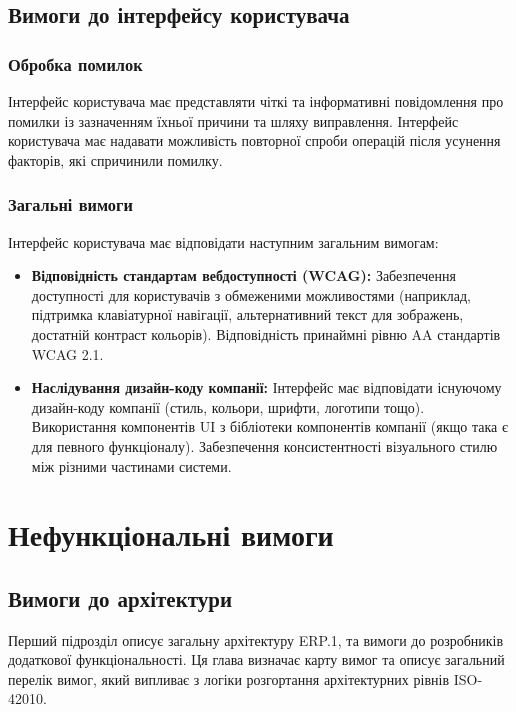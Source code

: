 \documentclass{article}
\begin{document}
\subsection{Вимоги до інтерфейсу користувача}

\subsubsection{Обробка помилок}
Інтерфейс користувача має представляти чіткі та інформативні повідомлення про помилки із
зазначенням їхньої причини та шляху виправлення. Інтерфейс користувача має надавати можливість
повторної спроби операцій після усунення факторів, які спричинили помилку.

\subsubsection{Загальні вимоги}
Інтерфейс користувача має відповідати наступним загальним вимогам:

\begin{itemize}
    \item \textbf{Відповідність стандартам вебдоступності (WCAG):} Забезпечення доступності для
           користувачів з обмеженими можливостями (наприклад, підтримка клавіатурної навігації,
           альтернативний текст для зображень, достатній контраст кольорів). Відповідність принаймні рівню AA стандартів WCAG 2.1.
    \item \textbf{Наслідування дизайн-коду компанії:} Інтерфейс має відповідати існуючому дизайн-коду
           компанії (стиль, кольори, шрифти, логотипи тощо). Використання компонентів UI з бібліотеки
           компонентів компанії (якщо така є для певного функціоналу). Забезпечення консистентності
           візуального стилю між різними частинами системи.
\end{itemize}

\newpage
\section{Нефункціональні вимоги}

\subsection{Вимоги до архітектури}

Перший підрозділ описує загальну архітектуру ERP.1, та вимоги до розробників додаткової функціональності.
Ця глава визначає карту вимог та описує загальний перелік вимог, який випливає з логіки розгортання
архітектурних рівнів ISO-42010.
\end{document}
